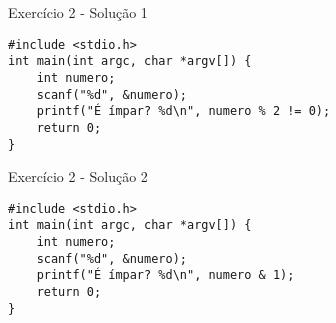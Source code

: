 \documentclass[t, aspectratio=169]{beamer}
\begin{document}
\begin{frame}[label={sec:org2e50fc2},fragile]{Exercício 2 - Solução 1}
 \begin{verbatim}
#include <stdio.h>
int main(int argc, char *argv[]) {
    int numero;
    scanf("%d", &numero);
    printf("É ímpar? %d\n", numero % 2 != 0);
    return 0;
}
\end{verbatim}
\end{frame}

\begin{frame}[label={sec:org80a6165},fragile]{Exercício 2 - Solução 2}
 \begin{verbatim}
#include <stdio.h>
int main(int argc, char *argv[]) {
    int numero;
    scanf("%d", &numero);
    printf("É ímpar? %d\n", numero & 1);
    return 0;
}
\end{verbatim}
\end{frame}
\end{document}
